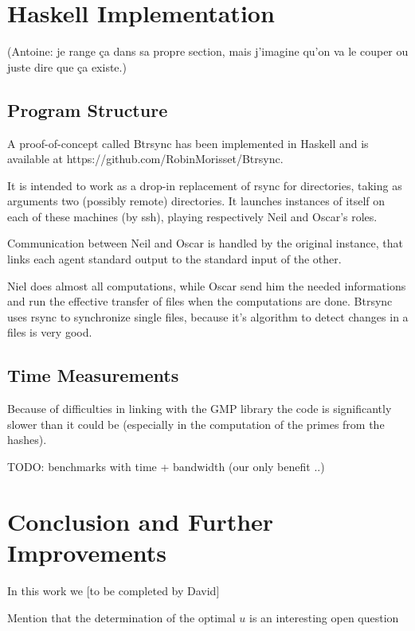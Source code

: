 \documentclass[11pt]{llncs}
\begin{document}
\section{Haskell Implementation}

(Antoine: je range ça dans sa propre section, mais j'imagine qu'on va le couper
ou juste dire que ça existe.)

\subsection{Program Structure}

A proof-of-concept called Btrsync has been implemented in Haskell and is
available at https://github.com/RobinMorisset/Btrsync.

It is intended to work as a drop-in replacement of rsync for directories, taking
as arguments two (possibly remote) directories. It launches instances of itself
on each of these machines (by ssh), playing respectively Neil and Oscar's roles.

Communication between Neil and Oscar is handled by the original instance, that
links each agent standard output to the standard input of the other.

Niel does almost all computations, while Oscar send him the needed
informations and run the effective transfer of files when the
computations are done. Btrsync uses rsync to synchronize single files,
because it's algorithm to detect changes in a files is very good.

\subsection{Time Measurements}

Because of difficulties in linking with the GMP library the code is
significantly slower than it could be (especially in the computation of the
primes from the hashes).

TODO: benchmarks with time + bandwidth (our only benefit ..)




\section{Conclusion and Further Improvements}

In this work we [to be completed by David]\smallskip

Mention that the determination of the optimal $u$ is an interesting open question
\end{document}
